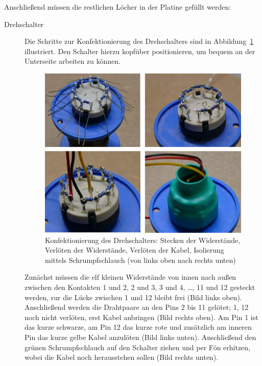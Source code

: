 \documentclass[paper=a4, open=any]{scrbook}
\begin{document}
				Anschließend müssen die restlichen Löcher in der Platine gefüllt werden:

				\begin{description}
					\item[Drehschalter] Die Schritte zur Konfektionierung des Drehschalters sind in Abbildung~\ref{fig:drehschalter} illustriert. Den Schalter hierzu kopfüber positionieren, um bequem an der Unterseite arbeiten zu können.

					      \begin{figure}
						      \centering\includegraphics[width=.8\textwidth]{Drehschalter}
						      \caption{Konfektionierung des Drehschalters: Stecken der Widerstände, Verlöten der Widerstände, Verlöten der Kabel, Isolierung mittels Schrumpfschlauch (von links oben nach rechts unten)}
						      \label{fig:drehschalter}
					      \end{figure}

					      Zunächst müssen die elf kleinen Widerstände von innen nach außen zwischen den Kontakten 1 und 2, 2 und 3, 3 und 4, \dots, 11 und 12 gesteckt werden, rur die Lücke zwischen 1 und 12 bleibt frei (Bild links oben). Anschließend werden die Drahtpaare an den Pins 2 bis 11 gelötet; 1, 12 noch nicht verlöten, erst Kabel anbringen (Bild rechts oben). Am Pin 1 ist das kurze schwarze, am Pin 12 das kurze rote und zusätzlich am inneren Pin das kurze gelbe Kabel anzulöten (Bild links unten). Anschließend den grünen Schrumpfschlauch auf den Schalter ziehen und per Fön erhitzen, wobei die Kabel noch herausstehen sollen (Bild rechts unten).


\end{description}
\end{document}
